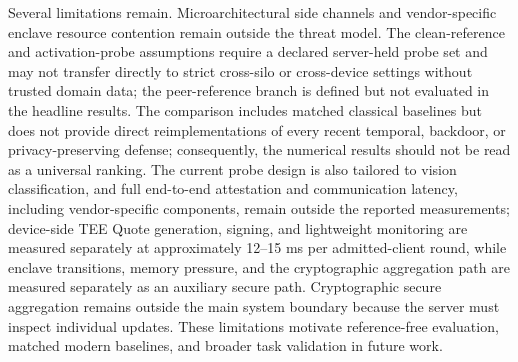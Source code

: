 \documentclass[conference,compsoc]{IEEEtran}
\begin{document}
Several limitations remain. Microarchitectural side channels and vendor-specific enclave resource contention remain outside the threat model. The clean-reference and activation-probe assumptions require a declared server-held probe set and may not transfer directly to strict cross-silo or cross-device settings without trusted domain data; the peer-reference branch is defined but not evaluated in the headline results. The comparison includes matched classical baselines but does not provide direct reimplementations of every recent temporal, backdoor, or privacy-preserving defense; consequently, the numerical results should not be read as a universal ranking. The current probe design is also tailored to vision classification, and full end-to-end attestation and communication latency, including vendor-specific components, remain outside the reported measurements; device-side TEE Quote generation, signing, and lightweight monitoring are measured separately at approximately 12--15 ms per admitted-client round, while enclave transitions, memory pressure, and the cryptographic aggregation path are measured separately as an auxiliary secure path. Cryptographic secure aggregation remains outside the main system boundary because the server must inspect individual updates. These limitations motivate reference-free evaluation, matched modern baselines, and broader task validation in future work.
\end{document}
